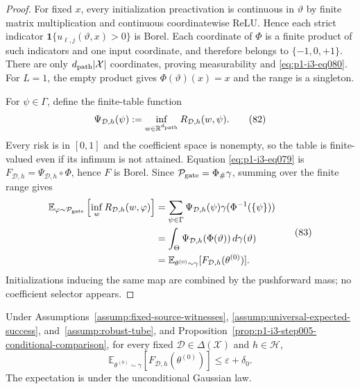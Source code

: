 \begin{proof}
For fixed $x$, every initialization preactivation is continuous in
$\vartheta$ by finite matrix multiplication and continuous coordinatewise
ReLU.  Hence each strict indicator
$\mathbf1\{u_{\ell,j}(\vartheta,x)>0\}$ is Borel.  Each coordinate of $\Phi$
is a finite product of such indicators and one input coordinate, and therefore
belongs to $\{-1,0,+1\}$.  There are only
$d_{\rm path}|\mathcal X|$ coordinates, proving measurability and \eqref{eq:p1-i3-eq080}.
For $L=1$, the empty product gives $\Phi(\vartheta)(x)=x$ and the range is a
singleton.

For $\psi\in\Gamma$, define the finite-table function
\[
\Psi_{\mathcal D,h}(\psi):=
\inf_{w\in\mathbb R^{d_{\rm path}}}R_{\mathcal D,h}(w,\psi).
\tag{82}\label{eq:p1-i3-eq082}
\]
Every risk is in $[0,1]$ and the coefficient space is nonempty, so the table
is finite-valued even if its infimum is not attained.  Equation \eqref{eq:p1-i3-eq079} is
$F_{\mathcal D,h}=\Psi_{\mathcal D,h}\circ\Phi$, hence $F$ is Borel.  Since
$\mathcal P_{\rm gate}=\Phi_\#\gamma$, summing over the finite range gives
\[
\begin{aligned}
\mathbb E_{\varphi\sim\mathcal P_{\rm gate}}
\left[\inf_wR_{\mathcal D,h}(w,\varphi)\right]
&=\sum_{\psi\in\Gamma}\Psi_{\mathcal D,h}(\psi)
\gamma(\Phi^{-1}(\{\psi\}))\\
&=\int_\Theta\Psi_{\mathcal D,h}(\Phi(\vartheta))\,d\gamma(\vartheta)\\
&=\mathbb E_{\theta^{(0)}\sim\gamma}[F_{\mathcal D,h}(\theta^{(0)})].
\end{aligned}
\tag{83}\label{eq:p1-i3-eq083}
\]
Initializations inducing the same map are combined by the pushforward mass;
no coefficient selector appears.
\end{proof}

\begin{proposition}
\label{prop:p1-i3-step006-event-split}
Under Assumptions~\ref{assump:fixed-source-witnesses},
\ref{assump:universal-expected-success}, and~\ref{assump:robust-tube}, and
Proposition~\ref{prop:p1-i3-step005-conditional-comparison}, for every fixed
$\mathcal D\in\Delta(\mathcal X)$ and $h\in\mathcal H$,
\[
\mathbb E_{\theta^{(0)}\sim\gamma}
[F_{\mathcal D,h}(\theta^{(0)})]\leq\varepsilon+\delta_0.
\tag{84}\label{eq:p1-i3-eq084}
\]
The expectation is under the unconditional Gaussian law.
\end{proposition}


